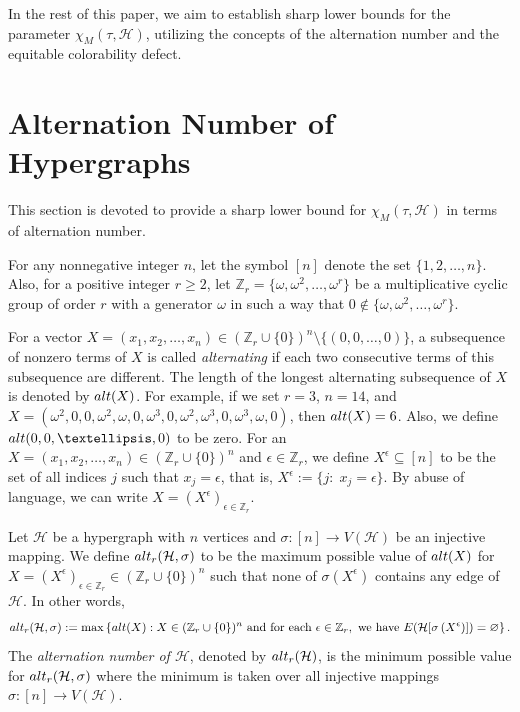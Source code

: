 \documentclass[11pt]{amsart}
\theoremstyle{definition}
\begin{document}
In the rest of this paper, we aim to establish sharp lower bounds for the parameter
$\chi_M(\tau , {\mathcal H})$, utilizing the concepts of the alternation number and the equitable colorability defect.

\maketitle
\section{{\bf Alternation Number of Hypergraphs}}

This section is devoted to provide a sharp lower bound for $\chi_M(\tau, {\mathcal H})$ in terms of alternation number.

For any nonnegative integer $n$, let the symbol $[n]$ denote the set $\{1, 2, \dots , n\}$.
Also, for a positive integer $r\geq 2$,
let $\mathbb{Z}_r=\{\omega,\omega^2,\ldots,\omega^r\}$ be a multiplicative cyclic group of order $r$  with a generator $\omega$ in such a way that
$0 \notin \{\omega,\omega^2,\ldots,\omega^r\}$.

\noindent For a vector $X=(x_1,x_2,\ldots,x_n)\in(\mathbb{Z}_r\cup\{0\})^n\setminus\{(0,0, \dots , 0)\}$, a subsequence of nonzero terms of $X$ is called {\it alternating} if each two consecutive terms of this subsequence are different.  The length of the longest alternating subsequence of $X$ is denoted by ${\rm alt}(X)$. For example,
if we set $r=3$, $n=14$, and $X=(\omega^2 , 0 , 0 , \omega^2,\omega , 0 ,\omega^3 , 0 , \omega^2 , \omega^3 , 0 , \omega^3 , \omega , 0)$, then ${\rm alt}(X)=6$.
Also, we define ${\rm alt}(0,0,\dots,0)$ to be zero.
For an $X=(x_1,x_2,\ldots,x_n)\in(\mathbb{Z}_r\cup\{0\})^n$ and $\epsilon\in \mathbb{Z}_r$, we define $X^\epsilon\subseteq [n]$ to be the set of all indices $j$ such that $x_j=\epsilon$, that is,
$X^\epsilon :=\{j:\; x_j=\epsilon\}$.
By abuse of language, we can write $X=\displaystyle{\left(X^\epsilon\right)}_{\epsilon\in\mathbb{Z}_r}$.

Let ${\mathcal H}$ be a hypergraph with $n$ vertices and $\sigma:[n]\longrightarrow V({\mathcal H})$ be an injective mapping.
We define ${\rm alt}_r({\mathcal H},\sigma)$ to be the maximum possible value of
${\rm alt} (X)$ for  $X=\displaystyle{\left(X^\epsilon\right)}_{\epsilon\in\mathbb{Z}_r}\in (\mathbb{Z}_r\cup\{0\})^n$ such that none of $\sigma(X^\epsilon)$ contains any edge of ${\mathcal H}$.
In other words,
$${\rm alt}_r({\mathcal H},\sigma) :=\max\left\{{\rm alt}(X): X\in(\mathbb{Z}_r\cup\{0\})^n \mbox{ and for each } \epsilon\in \mathbb{Z}_r, \mbox{ we have } E({\mathcal H}[\sigma\left(X^\epsilon\right)])=\varnothing  \right\}.$$
The {\it alternation number of ${\mathcal H}$}, denoted by ${\rm alt}_r({\mathcal H})$, is the minimum possible value for ${\rm alt}_r({\mathcal H},\sigma)$ where the minimum is taken over all
injective mappings $\sigma:[n]\longrightarrow V({\mathcal H})$.
\end{document}
